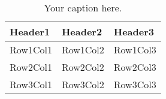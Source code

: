 \begin{table}[h!]
\centering
\begin{tabular}{|l|l|l|}
\hline
\textbf{Header1} & \textbf{Header2} & \textbf{Header3} \\
\hline
Row1Col1 & Row1Col2 & Row1Col3 \\
\hline
Row2Col1 & Row2Col2 & Row2Col3 \\
\hline
Row3Col1 & Row3Col2 & Row3Col3 \\
\hline
\end{tabular}
\caption{Your caption here.}
\label{table:your_label_here}
\end{table}